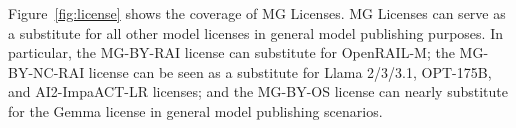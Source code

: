 

Figure~\ref{fig:license} shows the coverage of MG Licenses. MG Licenses can serve as a substitute for all other model licenses in general model publishing purposes.
In particular, the MG-BY-RAI license can substitute for OpenRAIL-M; the MG-BY-NC-RAI license can be seen as a substitute for Llama 2/3/3.1, OPT-175B, and AI2-ImpaACT-LR licenses; and the MG-BY-OS license can nearly substitute for the Gemma license in general model publishing scenarios.


